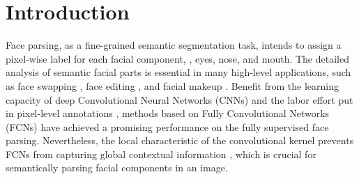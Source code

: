 \documentclass[10pt,twocolumn,letterpaper]{article}
\begin{document}
\section{Introduction}

Face parsing, as a fine-grained semantic segmentation task, intends to assign a pixel-wise label for each facial component, \eg, eyes, nose, and mouth. The detailed analysis of semantic facial parts is essential in many high-level applications, such as face swapping \cite{nirkin2019fsgan}, face editing \cite{CelebAMask-HQ}, and facial makeup \cite{ou2016beauty}. Benefit from the learning capacity of deep Convolutional Neural Networks (CNNs) and the labor effort put in pixel-level annotations \cite{helen, lapa, CelebAMask-HQ}, methods based on Fully Convolutional Networks (FCNs) \cite{ehanet, multi_objective, icnn, cnn_cascade, lius, Zhou2017FacePV, guo2018, te2020edge, lin2021roi} have achieved a promising performance on the fully supervised face parsing. Nevertheless, the local characteristic of the convolutional kernel prevents FCNs from capturing global contextual information \cite{Merget_2018_CVPR}, which is crucial for semantically parsing facial components in an image.
\end{document}
